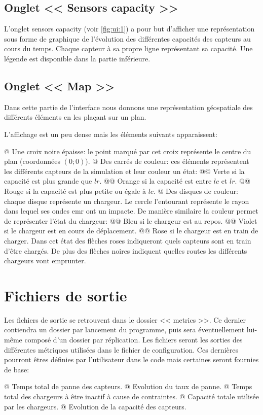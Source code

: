 \documentclass[final]{polytech/polytech}
\begin{document}
		\subsection{Onglet << Sensors capacity >>}
			L'onglet sensors capacity (voir \autoref{fig:ui:1}) a pour but d'afficher une représentation sous forme de graphique de l'évolution des différentes capacités des capteurs au cours du temps.
			Chaque capteur à sa propre ligne représentant sa capacité.
			Une légende est disponible dans la partie inférieure.
			
		\subsection{Onglet << Map >>}
			Dans cette partie de l'interface nous donnons une représentation géospatiale des différents éléments en les plaçant sur un plan.
			
			
			L'affichage est un peu dense mais les éléments suivants apparaissent:
			\begin{easylist}
				@ Une croix noire épaisse: le point marqué par cet croix représente le centre du plan (coordonnées $\left(0;0\right)$).
				@ Des carrés de couleur: ces éléments représentent les différents capteurs de la simulation et leur couleur un état:
				@@ Verte si la capacité est plus grande que $lr$.
				@@ Orange si la capacité est entre $lc$ et $lr$.
				@@ Rouge si la capacité est plus petite ou égale à $lc$.
				@ Des disques de couleur: chaque disque représente un chargeur. Le cercle l'entourant représente le rayon dans lequel ses ondes \gls{emr} ont un impacte. De manière similaire la couleur permet de représenter l'état du chargeur:
				@@ Bleu si le chargeur est au repos.
				@@ Violet si le chargeur est en cours de déplacement.
				@@ Rose si le chargeur est en train de charger. Dans cet état des flèches roses indiqueront quels capteurs sont en train d'être chargés.
				De plus des flèches noires indiquent quelles routes les différents chargeurs vont emprunter.
			\end{easylist}

	\section{Fichiers de sortie\label{sec:csvoutput}}
		Les fichiers de sortie se retrouvent dans le dossier << metrics >>.
		Ce dernier contiendra un dossier par lancement du programme, puis sera éventuellement lui-même composé d'un dossier par réplication.
		Les fichiers seront les sorties des différentes métriques utilisées dans le fichier de configuration.
		Ces dernières pourront êtres définies par l'utilisateur dans le code mais certaines seront fournies de base:
		\begin{easylist}[itemize]
			@ Temps total de panne des capteurs.
			@ Evolution du taux de panne.
			@ Temps total des chargeurs à être inactif à cause de contraintes.
			@ Capacité totale utilisée par les chargeurs.
			@ Evolution de la capacité des capteurs.
		\end{easylist}
		
\end{document}
